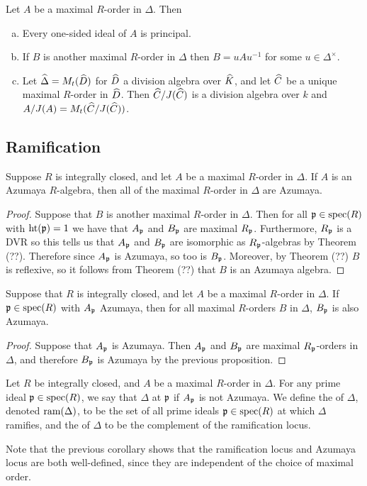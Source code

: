 \begin{thm}
Let $A$ be a maximal $R$-order in $\Delta$.  Then
\begin{enumerate}[(a)]
\item  Every one-sided ideal of $A$ is principal.
\item  If $B$ is another maximal $R$-order in $\Delta$ then $B = uAu^{-1}$ for some $u\in \Delta^\times$.
\item  Let $\widehat\Delta = M_t(\widehat D)$ for $\widehat D$ a division algebra over $\widehat K$, and let $\widehat C$ be a unique maximal $R$-order in $\widehat D$.  Then $\widehat C/J(\widehat C)$ is a division algebra over $k$ and $A/J(A) = M_t(\widehat C/J(\widehat C))$.
\end{enumerate}
\end{thm}


\subsection{Ramification}
\begin{prop}
Suppose $R$ is integrally closed, and let $A$ be a maximal $R$-order in $\Delta$.  If $A$ is an Azumaya $R$-algebra, then all of the maximal $R$-order in $\Delta$ are Azumaya.
\end{prop}
\begin{proof}
Suppose that $B$ is another maximal $R$-order in $\Delta$.  Then for all $\mathfrak{p}\in\textnormal{spec}(R)$ with $\textnormal{ht}(\mathfrak{p}) = 1$ we have that $A_{\mathfrak{p}}$ and $B_{\mathfrak{p}}$ are maximal $R_{\mathfrak{p}}$.  Furthermore, $R_{\mathfrak{p}}$ is a DVR so this tells us that $A_{\mathfrak{p}}$ and $B_{\mathfrak{p}}$ are isomorphic as $R_{\mathfrak{p}}$-algebras by Theorem (??).  Therefore since $A_{\mathfrak{p}}$ is Azumaya, so too is $B_{\mathfrak{p}}$.  Moreover, by Theorem (??) $B$ is reflexive, so it follows from Theorem (??) that $B$ is an Azumaya algebra.
\end{proof}
\begin{cor}
Suppose that $R$ is integrally closed, and let $A$ be a maximal $R$-order in $\Delta$.  If $\mathfrak{p}\in\textnormal{spec}(R)$ with $A_{\mathfrak{p}}$ Azumaya, then for all maximal $R$-orders $B$ in $\Delta$, $B_{\mathfrak{p}}$ is also Azumaya.
\end{cor}
\begin{proof}
Suppose that $A_{\mathfrak{p}}$ is Azumaya.  Then $A_{\mathfrak{p}}$ and $B_{\mathfrak{p}}$ are maximal $R_{\mathfrak{p}}$-orders in $\Delta$, and therefore $B_{\mathfrak{p}}$ is Azumaya by the previous proposition.
\end{proof}

\begin{defn}
Let $R$ be integrally closed, and $A$ be a maximal $R$-order in $\Delta$.  For any prime ideal $\mathfrak{p}\in\textnormal{spec}(R)$, we say that $\Delta$  at $\mathfrak{p}$ if $A_{\mathfrak{p}}$ is not Azumaya.  We define the  of $\Delta$, denoted $\textnormal{ram}(\Delta)$, to be the set of all prime ideals $\mathfrak{p}\in\textnormal{spec}(R)$ at which $\Delta$ ramifies, and the  of $\Delta$ to be the complement of the ramification locus.
\end{defn}
Note that the previous corollary shows that the ramification locus and Azumaya locus are both well-defined, since they are independent of the choice of maximal order.

